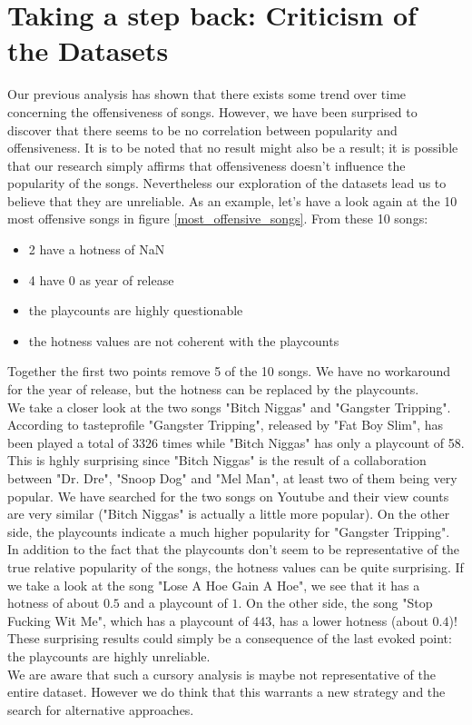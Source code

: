 \documentclass[11pt]{article}
\begin{document}
\section{Taking a step back: Criticism of the Datasets}
Our previous analysis has shown that there exists some trend over time concerning the offensiveness of songs. However, we have been surprised to discover that there seems to be no correlation between popularity and offensiveness. It is to be noted that no result might also be a result; it is possible that our research simply affirms that offensiveness doesn't influence the popularity of the songs. Nevertheless our exploration of the datasets lead us to believe that they are unreliable.
As an example, let's have a look again at the 10 most offensive songs in figure \ref{most_offensive_songs}.
From these 10 songs:
\begin{itemize}
  \item 2 have a hotness of NaN
  \item 4 have 0 as year of release
  \item the playcounts are highly questionable
  \item the hotness values are not coherent with the playcounts
\end{itemize}
Together the first two points remove 5 of the 10 songs. We have no workaround for the year of release, but the hotness can be replaced by the playcounts.\\
We take a closer look at the two songs "Bitch Niggas" and "Gangster Tripping". According to tasteprofile "Gangster Tripping", released by "Fat Boy Slim", has been played a total of 3326 times while "Bitch Niggas" has only a playcount of 58. This is hghly surprising since "Bitch Niggas" is the result of a collaboration between "Dr. Dre", "Snoop Dog" and "Mel Man", at least two of them being very popular.
We have searched for the two songs on Youtube and their view counts are very similar ("Bitch Niggas" is actually a little more popular).
On the other side, the playcounts indicate a much higher popularity for "Gangster Tripping".\\
In addition to the fact that the playcounts don't seem to be representative of the true relative popularity of the songs, the hotness values can be quite surprising. If we take a look at the song "Lose A Hoe Gain A Hoe", we see that it has a hotness of about $0.5$ and a playcount of $1$. On the other side, the song "Stop Fucking Wit Me", which has a playcount of $443$, has a lower hotness (about $0.4$)! These surprising results could simply be a consequence of the last evoked point: the playcounts are highly unreliable.\\ 
We are aware that such a cursory analysis is maybe not representative of the entire dataset.
However we do think that this warrants a new strategy and the search for alternative approaches.
\end{document}
